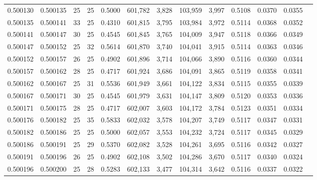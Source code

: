 \begin{tabular}{rrrrrrrrrrrrr}
0.500130 & 0.500135 &    25 &  25 &                                     0.5000 & 601,782 &   3,828 & 103,959 &   3,997 & 0.5108 & 0.0370 & 0.0355 \\
0.500135 & 0.500141 &    33 &  25 &                                     0.4310 & 601,815 &   3,795 & 103,984 &   3,972 & 0.5114 & 0.0368 & 0.0352 \\
0.500141 & 0.500147 &    30 &  25 &                                     0.4545 & 601,845 &   3,765 & 104,009 &   3,947 & 0.5118 & 0.0366 & 0.0349 \\
0.500147 & 0.500152 &    25 &  32 &                                     0.5614 & 601,870 &   3,740 & 104,041 &   3,915 & 0.5114 & 0.0363 & 0.0346 \\
0.500152 & 0.500157 &    26 &  25 &                                     0.4902 & 601,896 &   3,714 & 104,066 &   3,890 & 0.5116 & 0.0360 & 0.0344 \\
0.500157 & 0.500162 &    28 &  25 &                                     0.4717 & 601,924 &   3,686 & 104,091 &   3,865 & 0.5119 & 0.0358 & 0.0341 \\
0.500162 & 0.500167 &    25 &  31 &                                     0.5536 & 601,949 &   3,661 & 104,122 &   3,834 & 0.5115 & 0.0355 & 0.0339 \\
0.500167 & 0.500171 &    30 &  25 &                                     0.4545 & 601,979 &   3,631 & 104,147 &   3,809 & 0.5120 & 0.0353 & 0.0336 \\
0.500171 & 0.500175 &    28 &  25 &                                     0.4717 & 602,007 &   3,603 & 104,172 &   3,784 & 0.5123 & 0.0351 & 0.0334 \\
0.500176 & 0.500182 &    25 &  35 &                                     0.5833 & 602,032 &   3,578 & 104,207 &   3,749 & 0.5117 & 0.0347 & 0.0331 \\
0.500182 & 0.500186 &    25 &  25 &                                     0.5000 & 602,057 &   3,553 & 104,232 &   3,724 & 0.5117 & 0.0345 & 0.0329 \\
0.500186 & 0.500191 &    25 &  29 &                                     0.5370 & 602,082 &   3,528 & 104,261 &   3,695 & 0.5116 & 0.0342 & 0.0327 \\
0.500191 & 0.500196 &    26 &  25 &                                     0.4902 & 602,108 &   3,502 & 104,286 &   3,670 & 0.5117 & 0.0340 & 0.0324 \\
0.500196 & 0.500200 &    25 &  28 &                                     0.5283 & 602,133 &   3,477 & 104,314 &   3,642 & 0.5116 & 0.0337 & 0.0322 \\

\end{tabular}
